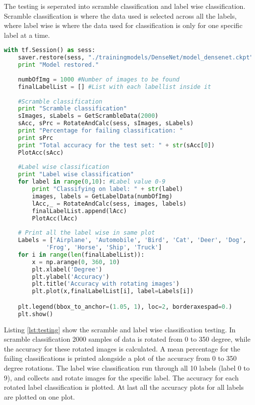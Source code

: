 The testing is seperated into scramble classification and label wise classification. Scramble classification is where the data used is selected across all the labels, where label wise is where the data used for classification is only for one specific label at a time.

\begin{lstlisting}[language=Python, label=lst:testing, caption=Testing the classification abilities for the model]
with tf.Session() as sess:
    saver.restore(sess, "./trainingmodels/DenseNet/model_densenet.ckpt")
    print "Model restored."
    
    numbOfImg = 1000 #Number of images to be found
    finalLabelList = [] #List with each labellist inside it
    
    #Scramble classification
    print "Scramble classification"
    sImages, sLabels = GetScrambleData(2000)
    sAcc, sPrc = RotateAndCalc(sess, sImages, sLabels)
    print "Percentage for failing classification: "
    print sPrc
    print "Total accuracy for the test set: " + str(sAcc[0])
    PlotAcc(sAcc)
    
    #Label wise classification
    print "Label wise classification"
    for label in range(0,10): #Label value 0-9
        print "Classifying on label: " + str(label)
        images, labels = GetLabelData(numbOfImg)
        lAcc,_ = RotateAndCalc(sess, images, labels)
        finalLabelList.append(lAcc)
        PlotAcc(lAcc)
    
    # Print all the label wise in same plot
    Labels = ['Airplane', 'Automobile', 'Bird', 'Cat', 'Deer', 'Dog', 
    		'Frog', 'Horse', 'Ship', 'Truck']
    for i in range(len(finalLabelList)):
        x = np.arange(0, 360, 10)
        plt.xlabel('Degree')
        plt.ylabel('Accuracy')
        plt.title('Accuracy with rotating images')
        plt.plot(x,finalLabelList[i], label=Labels[i])

    plt.legend(bbox_to_anchor=(1.05, 1), loc=2, borderaxespad=0.)
    plt.show()
\end{lstlisting}

Listing \ref{lst:testing} show the scramble and label wise classification testing. In scramble classification 2000 samples of data is rotated from 0 to 350 degree, while the accuracy for these rotated images is calculated. A mean percentage for the failing classifications is printed alongside a plot of the accuracy from 0 to 350 degree rotations. The label wise classification run through all 10 labels (label 0 to 9), and collects and rotate images for the specific label. The accuracy for each rotated label classification is plotted. At last all the accuracy plots for all labels are plotted on one plot.

